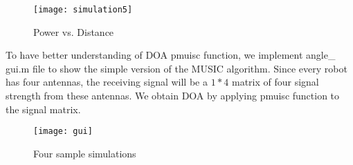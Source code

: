 \begin{figure}[ht]
	\centering
	\texttt{[image: simulation5]}
	\caption{Power vs. Distance}
	\end{figure}
	
\par
	To have better understanding of DOA pmuisc function, we implement angle\_ gui.m file to show the simple version of the MUSIC algorithm. Since every robot has four antennas, the receiving signal will be a $1 * 4$ matrix of four signal strength from these antennas. We obtain DOA by applying pmuisc function to the signal matrix.\\
    \begin{figure}[ht]
	\centering
	\texttt{[image: gui]}
	\caption{Four sample simulations}
	\end{figure}
